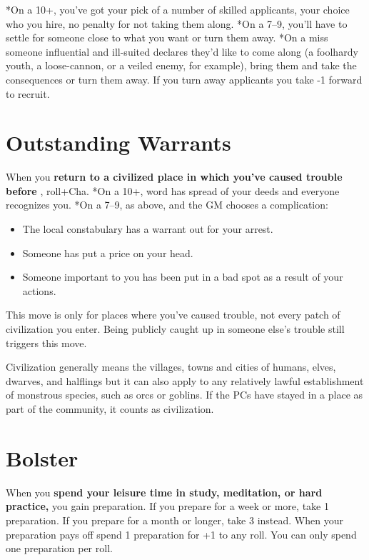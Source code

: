 *On a 10+, you've got your pick of a number of skilled applicants, your choice who you hire, no penalty for not taking them along. *On a 7--9, you'll have to settle for someone close to what you want or turn them away. *On a miss someone influential and ill-suited declares they'd like to come along (a foolhardy youth, a loose-cannon, or a veiled enemy, for example), bring them and take the consequences or turn them away. If you turn away applicants you take -1 forward to recruit.
\section*{Outstanding Warrants}
\HRule
When you \textbf{return to a civilized place in which you've caused trouble before}
, roll+Cha. *On a 10+, word has spread of your deeds and everyone recognizes you. *On a 7--9, as above, and the GM chooses a complication:
\begin{itemize}
\item The local constabulary has a warrant out for your arrest.
\item Someone has put a price on your head.
\item Someone important to you has been put in a bad spot as a result of your actions.
\end{itemize}
\HRule

This move is only for places where you've caused trouble, not every patch of civilization you enter. Being publicly caught up in someone else's trouble still triggers this move.

Civilization generally means the villages, towns and cities of humans, elves, dwarves, and halflings but it can also apply to any relatively lawful establishment of monstrous species, such as orcs or goblins. If the PCs have stayed in a place as part of the community, it counts as civilization.
\section*{Bolster}

\HRule
When you \textbf{spend your leisure time in study, meditation, or hard practice,}
you gain preparation. If you prepare for a week or more, take 1 preparation. If you prepare for a month or longer, take 3 instead. When your preparation pays off spend 1 preparation for +1 to any roll. You can only spend one preparation per roll.
\HRule

